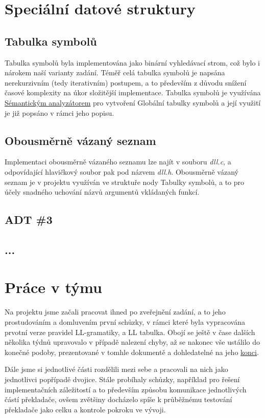 \documentclass[a4paper, 11pt]{article}
\begin{document}
	\section{Speciální datové struktury}

	\subsection{Tabulka symbolů}
	\label{symtab}
	Tabulka symbolů byla implementována jako binární vyhledávací strom, což bylo i nárokem naší varianty zadání. Téměř celá tabulka symbolů je napsána 
	nerekurzivním (tedy iterativním) postupem, a to především z důvodu snížení časové komplexity na úkor složitější implementace. Tabulka symbolů je 
	využívána \hyperref[semantic]{Sémantickým analyzátorem} pro vytvoření Globální tabulky symbolů a její využití je již popsáno v rámci jeho popisu.
	\subsection{Obousměrně vázaný seznam}
	Implementaci obousměrně vázaného seznamu lze najít v souboru \textit{dll.c}, a odpovídající hlavičkový soubor pak pod názvem \textit{dll.h}. Obousměrně 
	vázaný seznam je v projektu využíván ve struktuře nody Tabulky symbolů, a to pro účely snadného uchování názvů argumentů vkládaných funkcí.
	\subsection{ADT \#3}
	\subsection{...}
	\section{Práce v týmu}
	Na projektu jsme začali pracovat ihned po zveřejnění zadání, a to jeho prostudováním a domluvením první schůzky, v rámci které byla vypracována prvotní 
	verze pravidel LL-gramatiky, a LL tabulka. Obojí se ještě v čase dalších několika týdnů upravovalo v případě nalezení chyby, až se nakonec vše ustálilo do 
	konečné podoby, prezentované v tomhle dokumentě a dohledatelné na jeho \hyperref[gram]{konci}.
	
	Dále jsme si jednotlivé části rozdělili mezi sebe a pracovali na nich jako jednotlivci popřípadě dvojice. Stále probíhaly schůzky, například pro řešení 
	implementačních záležitostí a to především způsobu komunikace jednotlivých částí překladače, ovšem zvětšiny docházelo spíše k průběžnému testování 
	překladače jako celku a kontrole pokroku ve vývoji.
\end{document}
